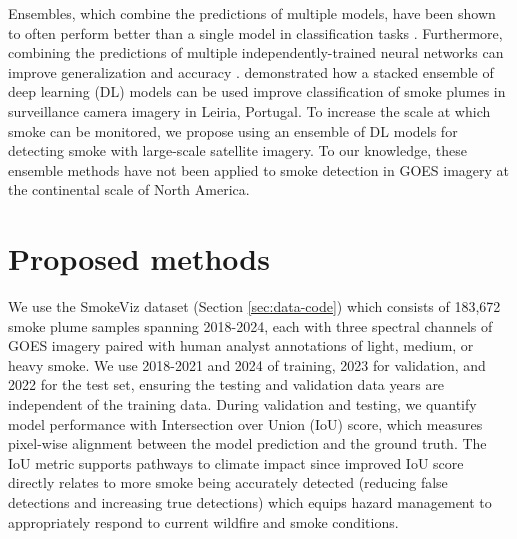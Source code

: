 \documentclass{article}
\begin{document}
Ensembles, which combine the predictions of multiple models, have been shown to often perform better than a single model in classification tasks \citep{ensemble-ml, ensemble-diversity}.  Furthermore, combining the predictions of multiple independently-trained neural networks can improve generalization and accuracy \citep{nn-ensemble,nn-ensemble2, nn-error-ens}. \citep{stacking-smoke-falcao} demonstrated how a stacked ensemble of deep learning (DL) models can be used improve classification of smoke plumes in surveillance camera imagery in Leiria, Portugal. To increase the scale at which smoke can be monitored, we propose using an ensemble of DL models for detecting smoke with large-scale satellite imagery. To our knowledge, these ensemble methods have not been applied to smoke detection in GOES imagery at the continental scale of North America.

\section{Proposed methods} 
We use the SmokeViz dataset (Section \ref{sec:data-code}) which consists of 183,672 smoke plume samples spanning 2018-2024, each with three spectral channels of GOES imagery paired with human analyst annotations of light, medium, or heavy smoke. We use 2018-2021 and 2024 of training, 2023 for validation, and 2022 for the test set, ensuring the testing and validation data years are independent of the training data. During validation and testing, we quantify model performance with Intersection over Union (IoU) score, which measures pixel-wise alignment between the model prediction and the ground truth. The IoU metric supports pathways to climate impact since improved IoU score directly relates to more smoke being accurately detected (reducing false detections and increasing true detections) which equips hazard management to appropriately respond to current wildfire and smoke conditions.
\end{document}
